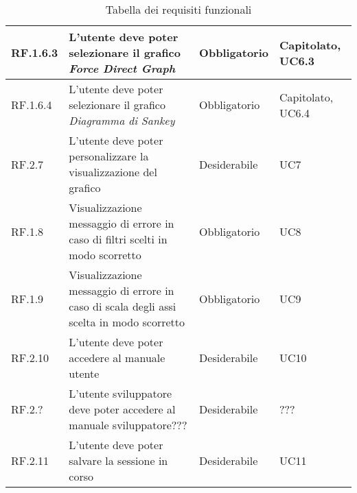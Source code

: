 \begin{table}[H]
\begin{tabular}{|p{}|p{6cm}|p{3cm}|p{2cm}|}
    \rowcolor[HTML]{EFEFEF}
    RF.1.6.3 & L'utente deve poter selezionare il grafico \textit{Force Direct Graph} & Obbligatorio & Capitolato, UC6.3 \\ \hline
    \rowcolor[HTML]{C0C0C0}
    RF.1.6.4 & L'utente deve poter selezionare il grafico \textit{Diagramma di Sankey} & Obbligatorio & Capitolato, UC6.4 \\ \hline
    \rowcolor[HTML]{EFEFEF}
    RF.2.7 & L'utente deve poter personalizzare la visualizzazione del grafico & Desiderabile & UC7 \\ \hline
    \rowcolor[HTML]{C0C0C0}
    RF.1.8 & Visualizzazione messaggio di errore in caso di filtri scelti in modo scorretto & Obbligatorio & UC8 \\ \hline
    \rowcolor[HTML]{EFEFEF}
    RF.1.9 & Visualizzazione messaggio di errore in caso di scala degli assi scelta in modo scorretto & Obbligatorio & UC9 \\ \hline
    \rowcolor[HTML]{C0C0C0}
    RF.2.10 & L'utente deve poter accedere al manuale utente & Desiderabile & UC10 \\ \hline
    \rowcolor[HTML]{EFEFEF}
    RF.2.? & L'utente sviluppatore deve poter accedere al manuale sviluppatore??? & Desiderabile & ??? \\ \hline
    \rowcolor[HTML]{C0C0C0}
    RF.2.11 & L'utente deve poter salvare la sessione in corso & Desiderabile & UC11 \\ \hline
  \end{tabular}
  \caption{Tabella dei requisiti funzionali}
\end{table}

